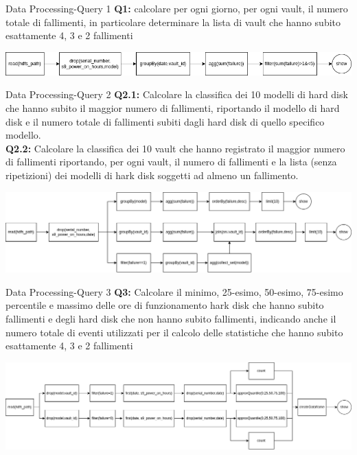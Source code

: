 \documentclass[13pt,aspectratio=169,t,xcolor=table]{beamer}
\begin{document}
\begin{frame}{Data Processing-Query 1}
    \textbf{Q1:} calcolare per ogni giorno, per ogni vault, il numero totale di fallimenti, in particolare determinare la lista di vault che hanno subito esattamente 4, 3 e 2 fallimenti
    \begin{adjustbox}{margin=0cm 0cm 0cm 2cm, center}
        \includegraphics[width=1\textwidth]{res/query1_dag.png}
    \end{adjustbox}
\end{frame}

\begin{frame}{Data Processing-Query 2}
    \textbf{Q2.1:} 
    Calcolare la classifica dei 10 modelli di hard disk che hanno subito il maggior numero di fallimenti, riportando il modello di hard disk e il numero totale di fallimenti subiti dagli hard disk di quello specifico modello.\\ 
    \vspace{0.2cm}
    \textbf{Q2.2:} 
    Calcolare la classifica dei 10 vault che hanno registrato il maggior numero di fallimenti riportando, per ogni vault, il numero di fallimenti e la lista (senza ripetizioni) dei modelli di hark disk soggetti ad almeno un fallimento.
    \begin{adjustbox}{margin=0cm 0cm 0cm 0.5cm, center}
        \includegraphics[width=1\textwidth]{res/query2_dag.png}
    \end{adjustbox}
\end{frame}

\begin{frame}{Data Processing-Query 3}
    \textbf{Q3:} Calcolare il minimo, 25-esimo, 50-esimo, 75-esimo percentile e massimo delle ore di funzionamento hark disk che hanno subito fallimenti e degli hard disk che non hanno subito fallimenti, indicando anche il numero totale di eventi utilizzati per il calcolo delle statistiche che hanno subito esattamente 4, 3 e 2 fallimenti
    \begin{adjustbox}{margin=0cm 0cm 0cm 0.5cm, center}
        \includegraphics[width=1\textwidth]{res/query3_dag.png}
    \end{adjustbox}
\end{frame}
\end{document}
